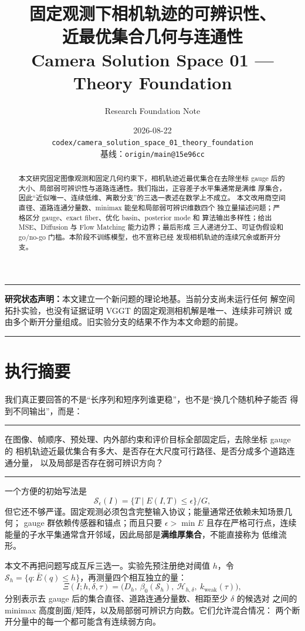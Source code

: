 \documentclass[UTF8,a4paper,11pt]{ctexart}
\title{\bfseries\color{DeepBlue}固定观测下相机轨迹的可辨识性、\\近最优集合几何与连通性\\[0.5em]
\large Camera Solution Space 01 --- Theory Foundation}
\author{Research Foundation Note}
\date{2026-08-22\\[0.25em]
\texttt{codex/camera\_solution\_space\_01\_theory\_foundation}\\
基线：\texttt{origin/main@15e96cc}}
\newcommand{\Sset}{\mathcal S}
\newenvironment{statusbox}
  {\begin{center}\begin{minipage}{0.94\textwidth}\small\color{DarkGray}
   \noindent\textcolor{AccentOrange}{\rule{\linewidth}{1.2pt}}\par\noindent}
  {\par\noindent\textcolor{AccentOrange}{\rule{\linewidth}{1.2pt}}
   \end{minipage}\end{center}}
\newenvironment{keybox}
  {\begin{center}\begin{minipage}{0.94\textwidth}\small\color{DarkGray}
   \noindent\textcolor{AccentBlue}{\rule{\linewidth}{1.2pt}}\par\noindent}
  {\par\noindent\textcolor{AccentBlue}{\rule{\linewidth}{1.2pt}}
   \end{minipage}\end{center}}
\begin{document}
\maketitle

\begin{statusbox}
\textbf{研究状态声明：}本文建立一个新问题的理论地基。当前分支尚未运行任何
解空间拓扑实验，也没有证据证明 VGGT 的固定观测相机解是唯一、连续非可辨识
或由多个断开分量组成。旧实验分支的结果不作为本文命题的前提。
\end{statusbox}

\begin{abstract}
本文研究固定图像观测和固定几何约束下，相机轨迹近最优集合在去除坐标 gauge
后的大小、局部弱可辨识性与道路连通性。我们指出，正容差子水平集通常是满维
厚集合，因此“近似唯一、连续低维、离散分支”的三选一表述在数学上不成立。
本文改用商空间直径、道路连通分量数、minimax 能垒和局部弱可辨识维数四个
独立量描述问题；严格区分 gauge、exact fiber、优化 basin、posterior mode 和
算法输出多样性；给出 MSE、Diffusion 与 Flow Matching 能力边界；最后形成
三人递进分工、可证伪假设和 go/no-go 门槛。本阶段不训练模型，也不宣称已经
发现相机轨迹的连续冗余或断开分支。
\end{abstract}

\tableofcontents
\newpage

\section{执行摘要}

我们真正要回答的不是“长序列和短序列谁更稳”，也不是“换几个随机种子能否
得到不同输出”，而是：

\begin{keybox}
在图像、帧顺序、预处理、内外部约束和评价目标全部固定后，去除坐标 gauge 的
相机轨迹近最优集合有多大、是否存在大尺度可行路径、是否分成多个道路连通分量，
以及局部是否存在弱可辨识方向？
\end{keybox}

一个方便的初始写法是
\begin{equation}
  \Sset_\epsilon(I)=\{T\mid E(I,T)\le\epsilon\}/G,
  \label{eq:initial-set}
\end{equation}
但它还不够严谨。固定观测必须包含完整输入协议；能量通常还依赖未知场景几何；
gauge 群依赖传感器和锚点；而且只要 $\epsilon>\min E$ 且存在严格可行点，连续
能量的子水平集通常含开邻域，因此局部是\textbf{满维厚集合}，不能直接称为
低维流形。

本文不再把问题写成互斥三选一。实验先预注册绝对阈值 $h$，令
$\Sset_h=\{q:\bar E(q)\le h\}$，再测量四个相互独立的量：
\begin{equation}
  \Xi(I;h,\delta,\tau)
  =\bigl(D_h,\ \beta_0(\Sset_h),\
  \mathcal H_{h,\delta},\ k_{\mathrm{weak}}(\tau)\bigr),
  \label{eq:descriptor}
\end{equation}
分别表示去 gauge 后的集合直径、道路连通分量数、相距至少 $\delta$ 的候选对
之间的 minimax 高度剖面/矩阵，以及局部弱可辨识方向数。它们允许混合情况：
两个断开分量中的每一个都可能含有连续弱方向。
\end{document}
